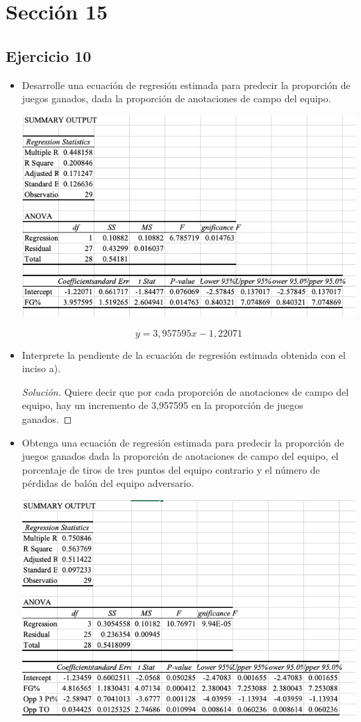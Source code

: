 \documentclass[a4paper,12pt]{article}
\newenvironment{solution}
  {\renewcommand\qedsymbol{$\blacksquare$}\begin{proof}[Solución]}
  {\end{proof}}
\begin{document}
\section{Sección 15}

\subsection{Ejercicio 10}
\begin{itemize}
    \item  Desarrolle una ecuación de regresión estimada para predecir la proporción de juegos ganados, dada la proporción de anotaciones de campo del equipo.
    \begin{center}
        \includegraphics[scale=0.5]{Imagenes/50-10.png}
    \end{center}
    $$y=3,957595x-1,22071$$
    \item Interprete la pendiente de la ecuación de regresión estimada obtenida con el inciso a).
    \begin{solution}
    Quiere decir que por cada proporción de anotaciones de campo del equipo, hay un incremento de 3,957595 en la proporción de juegos ganados.
    \end{solution}
    \item Obtenga una ecuación de regresión estimada para predecir la proporción de juegos ganados dada la proporción de anotaciones de campo del equipo, el porcentaje de tiros de tres puntos del equipo contrario y el número de pérdidas de balón del equipo adversario.
    \begin{center}
        \includegraphics[scale=0.5]{Imagenes/50-10-1.png}

\end{center}
\end{itemize}
\end{document}
